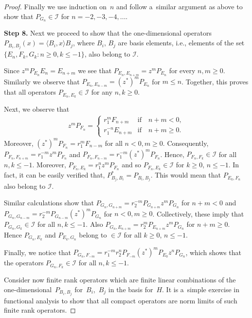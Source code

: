\documentclass[11pt]{article}
\numberwithin{equation}{section}
\begin{document}
\begin{proof}
Finally we use induction on~$n$ and follow a~similar argument as above to show that $P_{G_n} \in \mathcal I$ for
$n=-2,-3, -4, \dots$.

{\bf Step 8.} Next we proceed to show that the one-dimensional operators $P_{B_i, B_j}(x)= \langle B_i, x \rangle B_j$,
where $B_i$, $B_j$ are basis elements, i.e., elements of the set $\{E_n, F_k, G_k: n \geq 0, k \leq -1\}$, also belong to
$\mathcal I$.

Since $z^m P_{E_n}E_n= E_{n+m}$ we see that $P_{E_n, E_{n+m}}=z^m P_{E_n}$ for every $n,m \geq 0$.
Similarly we observe that $P_{E_n, E_{n-m}}=(z^*)^mP_{E_n}$ for $m \leq n$.
Together, this proves that all operators $P_{E_n, E_k} \in \mathcal I$ for any $n,k \geq 0$.

Next, we observe that
\begin{gather*}
z^m P_{F_n}=
\begin{cases}
r_1^m F_{n+m} & \text{if}\quad  n+m <0,
\\
r_1^{-n}E_{n+m} & \text{if}\quad  n+m \geq 0.
\end{cases}
\end{gather*}
Moreover, $(z^*)^m P_{F_n}=r_1^m F_{n-m}$ for all $n<0, m\geq 0$.
Consequently, $P_{F_n,F_{n+m}}=r_1^{-m}z^m P_{F_n}$ and $P_{F_n,F_{n-m}}=r_1^{-m} (z^*)^m P_{F_n}$.
Hence, $P_{F_n, F_k} \in \mathcal I$ for all $n,k \leq -1$.
Moreover, $P_{F_n,E_k}=r_1^nz^mP_{F_n}$ and so $P_{F_n,E_k}\in\mathcal I$ for $k\geq 0$, $n\leq -1$.
In fact, it can be easily verif\/ied that, $P_{B_j, B_i}^*=P_{B_i, B_j}$.
This would mean that $P_{E_k,F_n}$ also belong to $\mathcal I$.

Similar calculations show that $P_{G_n, G_{n+m}}= r_2^{-m}P_{G_{n+m}}z^m P_{G_n}$ for $n+m<0$ and $P_{G_n, G_{n-m}}=
r_2^{-m}P_{G_{n-m}}(z^*)^m P_{G_n}$ for $n<0, m\geq 0$.
Collectively, these imply that $P_{G_n, G_k} \in \mathcal I$ for all \mbox{$n,k \leq -1$}.
Also $P_{G_n, E_{n+m}}= r_2^{m}P_{E_{n+m}}z^m P_{G_n}$ for $n+m \geq 0$.
Hence $P_{G_n, E_k}$ and $P_{E_k,G_n}$ belong to $\in \mathcal I$ for all $k \geq 0$, $n \leq -1$.

Finally, we notice that $P_{G_n, F_{-m}}= r_1^{-m}r_2^n P_{F_{-m}}(z^*)^m P_{E_0}z^n P_{G_n}$, which shows that the
operators $P_{G_n, F_k} \in \mathcal I$ for all $n,k \leq -1$.

Consider now f\/inite rank operators which are f\/inite linear combinations of the one-dimensio\-nal~$P_{B_i, B_j}$ for~$B_i$,~$B_j$ in the basis for~$H$.
It is a~simple exercise in functional analysis to show that all compact operators are norm limits of such f\/inite rank
operators.
\end{proof}
\end{document}
